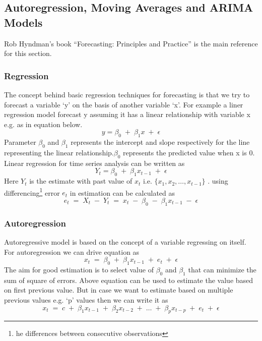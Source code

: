  
\subsection{Autoregression, Moving Averages and ARIMA Models}     
 Rob Hyndman's book ``Forecasting: Principles and Practice''\cite{hyndman2014forecasting} is the main reference for this section. 
 \subsubsection{Regression}The concept behind basic regression techniques for forecasting is that we try to forecast a variable `y' on the basis of another variable `x'. For example a liner regression model forecast y assuming it has a linear relationship with  variable x e.g. as in equation below.
 $$ y = \beta_{0}\;+\;\beta_{1}x\;+\;\epsilon $$
 Parameter \(\beta_0\) and \(\beta_1\) represents the intercept and slope respectively for the line representing  the linear relationship.\(\beta_0\) represents the predicted value when x is 0. Linear regression for time series analysis can be written as 
 $$ Y_{t} = \beta_{0}\;+\;\beta_{1}x_{t-1}\;+\;\epsilon $$
 Here \(Y_{t}\) is the estimate with past value of \(x_{t}\) i.e. \(\{x_1,x_2,\dotsc, x_{t-1}\}\) . using differencing\footnote{he differences between consecutive observations} error \(e_{t}\) in estimation can be calculated as
 \begin{equation}
 e_{t}\;=\; X_{t}\; -\; Y_{t}\;=\; x_{t}\; -\;\beta_{0}\;-\;\beta_{1}x_{t-1}\;-\;\epsilon
 \end{equation}
 \subsubsection{Autoregression}  
 Autoregressive model is based on the concept of a variable regressing on itself. For autoregression we can drive equation as
  \begin{equation}
  x_{t}\; =\;\beta_{0}\;+\;\beta_{1}x_{t-1}\;+\;e_{t}\;+\;\epsilon
  \end{equation} 
  The aim for good estimation is to select value of \(\beta_0\) and \(\beta_1\) that can minimize the sum of square of errors. Above equation can be used to estimate the value based on first previous value. But in case we want to estimate based on multiple previous values e.g. `p' values then we can write it as 
 \begin{equation} \label{AR}
  x_{t}\; =\;c\;+\;\beta_{1}x_{t-1}\;+\;\beta_{2}x_{t-2}\;+\;\dotsc\;+\;\beta_{p}x_{t-p}\;+\;e_{t}\;+\;\epsilon
 \end{equation}
 
